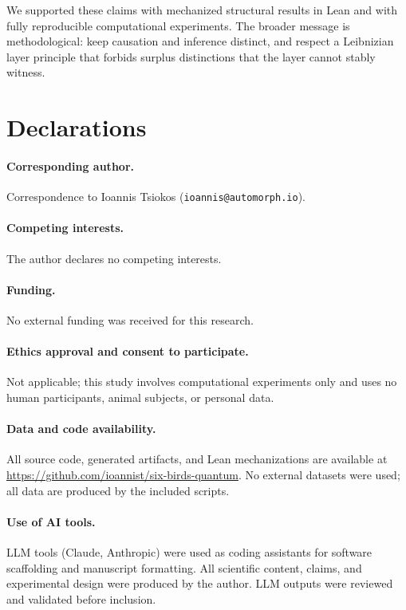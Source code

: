 \documentclass[11pt]{article}
\begin{document}
We supported these claims with mechanized structural results in Lean and with fully reproducible computational experiments.
The broader message is methodological: keep causation and inference distinct, and respect a Leibnizian layer principle that forbids surplus distinctions that the layer cannot stably witness.

\section*{Declarations}

\paragraph{Corresponding author.}
Correspondence to Ioannis Tsiokos (\texttt{ioannis@automorph.io}).

\paragraph{Competing interests.}
The author declares no competing interests.

\paragraph{Funding.}
No external funding was received for this research.

\paragraph{Ethics approval and consent to participate.}
Not applicable; this study involves computational experiments only and uses no human participants, animal subjects, or personal data.

\paragraph{Data and code availability.}
All source code, generated artifacts, and Lean mechanizations are available at \url{https://github.com/ioannist/six-birds-quantum}. No external datasets were used; all data are produced by the included scripts.

\paragraph{Use of AI tools.}
LLM tools (Claude, Anthropic) were used as coding assistants for software scaffolding and manuscript formatting. All scientific content, claims, and experimental design were produced by the author. LLM outputs were reviewed and validated before inclusion.
 
\end{document}
